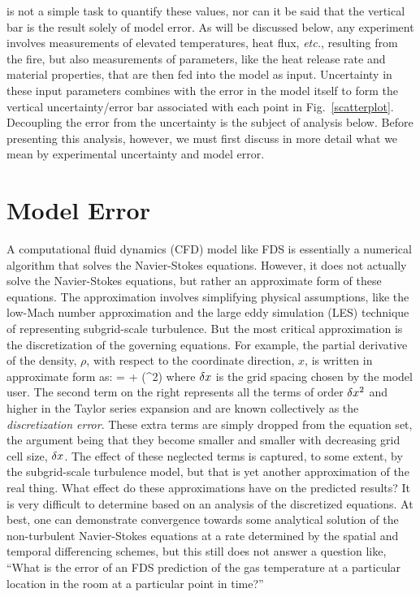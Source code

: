 is not a simple task to quantify these values, nor can it be said that the vertical bar is the result solely of model error. As will be discussed below, any
experiment involves measurements of elevated temperatures, heat flux, {\em etc.}, resulting from the fire, but also measurements of parameters, like the
heat release rate and material properties, that are then fed into the model as input. Uncertainty in these input parameters combines with the error in the model
itself to form the vertical uncertainty/error bar associated with each point in Fig.~\ref{scatterplot}. Decoupling the error from the uncertainty 
is the subject of analysis below. Before presenting this
analysis, however, we must first discuss in more detail what we mean by experimental uncertainty and model error.


\section{Model Error}

A computational fluid dynamics (CFD) model like FDS is essentially a numerical algorithm that solves the Navier-Stokes equations.
However, it does not actually solve the Navier-Stokes equations, but rather an approximate form of these equations. The approximation involves simplifying
physical assumptions, like the low-Mach number approximation and the large eddy simulation (LES) technique of representing subgrid-scale turbulence.
But the most critical approximation is the discretization of the governing equations. For example, the partial derivative of the density, $\rho$,
with respect to the coordinate direction, $x$, is written in approximate form as:
\be {} =  + (\dx^2) \ee
where $\delta x$ is the grid spacing chosen by the model user.
The second term on the right represents all the terms of order $\delta x^2$ and higher in the Taylor series expansion and are known collectively as the
{\em discretization error}. These extra terms are simply dropped from
the equation set, the argument being that they become smaller and smaller with decreasing grid cell size, $\delta x$. The effect of these neglected terms is captured, to
some extent, by the subgrid-scale turbulence model, but that is yet another approximation of the real thing. What effect do these approximations have on
the predicted results? It is very difficult to determine based on an analysis of the discretized equations. At best, one can demonstrate convergence towards some
analytical solution of the non-turbulent Navier-Stokes equations at a rate determined by the spatial and temporal differencing schemes, but this still does not answer a
question like, ``What is the error of an FDS prediction of the gas temperature at a particular location in the room at a particular point in time?''

